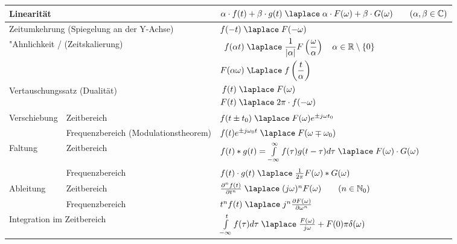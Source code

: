 \begin{tabular}{|p{2.5cm}|p{6cm}|p{8.5cm}|}
	\hline
	\multicolumn{2}{|l}{Linearität} & $\alpha\cdot f(t) + \beta\cdot g(t) \; \laplace \; \alpha\cdot F(\omega) +\beta\cdot G(\omega) \qquad (\alpha, \beta \in \mathbb{C})$  \\ 
	\hline
	\multicolumn{2}{|l}{Zeitumkehrung (Spiegelung an der Y-Achse)} & $f(-t) \; \laplace \; F(-\omega)$ \\
	\hline
	\multicolumn{2}{|l}{"Ahnlichkeit / (Zeitskalierung)}             &      		$\begin{aligned}f(\alpha t) \; &\laplace \; \frac{1}{|\alpha|}F \left (\frac{\omega}{\alpha} \right)
		\quad\alpha \in\mathbb{R}\setminus \{0\}\\
		F(\alpha\omega) \; &\Laplace \; f\left(\frac{t}{\alpha}\right)\end{aligned}$\\ 
	\hline
	\multicolumn{2}{|l}{Vertauschungssatz (Dualität)}              & 
	\begin{math}
		\begin{aligned}
			f(t) \; &\laplace \; F(\omega)\nonumber \\ 
			F(t) \; &\laplace \; 2\pi \cdot f(-\omega)
		\end{aligned}
	\end{math}\\ 
	\hline
	\hline
	\multirow{2}{*}{Verschiebung} & Zeitbereich & $f(t\pm t_0) \; \laplace \; F(\omega)e^{\pm j\omega t_0}$ \\ 
	\cline{2-3} 
	& Frequenzbereich (Modulationstheorem) & $f(t)e^{\pm j\omega_0 t} \; \laplace \; F(\omega\mp\omega_0)$ \\ 
	\hline
	\hline
	\multirow{2}{*}{Faltung} & Zeitbereich & $f(t) \ast g(t) = \int\limits_{-\infty}^{\infty} f(\tau)g(t-\tau)d\tau \; \laplace \;
	F(\omega) \cdot G(\omega)$ \\ 
	\cline{2-3} 
	& Frequenzbereich & $f(t) \cdot g(t) \; \laplace \; \frac{1}{2\pi}F(\omega) \ast G(\omega)$ \\ 
	\hline
	\hline
	\multirow{2}{*}{Ableitung} & Zeitbereich & $\frac{\partial^n f(t)}{\partial t^n} \; \laplace \; (j\omega)^n F(\omega) \qquad (n \in \mathbb{N}_0)$ \\ 
	\cline{2-3} 
	& Frequenzbereich &  $t^n f(t) \; \laplace \; j^n \frac{\partial F(\omega)}{\partial \omega^n}$\\ 
	\hline
	\hline
	\multicolumn{2}{|l}{Integration im Zeitbereich} & $\int\limits_{-\infty}^{t}f(\tau)d\tau \; \laplace \;
	\frac{F(\omega)}{j\omega}+F(0)\pi\delta(\omega)$\\ 

\end{tabular}
